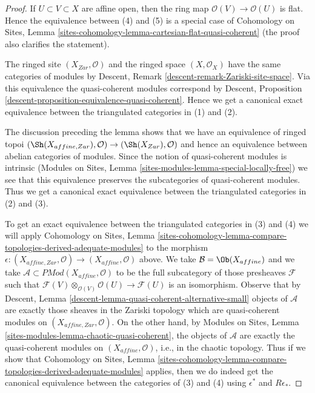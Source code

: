 \begin{proof}
If $U \subset V \subset X$ are affine open, then the ring map
$\mathcal{O}(V) \to \mathcal{O}(U)$ is flat. Hence
the equivalence between (4) and (5) is a special case of
Cohomology on Sites, Lemma
\ref{sites-cohomology-lemma-cartesian-flat-quasi-coherent}
(the proof also clarifies the statement).

\medskip\noindent
The ringed site $(X_{Zar}, \mathcal{O})$ and the ringed space
$(X, \mathcal{O}_X)$ have the same categories of modules by
Descent, Remark \ref{descent-remark-Zariski-site-space}.
Via this equivalence the quasi-coherent modules correspond by
Descent, Proposition \ref{descent-proposition-equivalence-quasi-coherent}.
Hence we get a canonical exact equivalence between the triangulated
categories in (1) and (2).

\medskip\noindent
The discussion preceding the lemma shows that we have an equivalence of
ringed topoi
$(\Sh(X_{affine, Zar}), \mathcal{O}) \to (\Sh(X_{Zar}), \mathcal{O})$
and hence an equivalence between abelian categories of modules.
Since the notion of quasi-coherent modules is intrinsic
(Modules on Sites, Lemma \ref{sites-modules-lemma-special-locally-free})
we see that this equivalence preserves the subcategories
of quasi-coherent modules. Thus we get a canonical exact equivalence
between the triangulated categories in (2) and (3).

\medskip\noindent
To get an exact equivalence between the triangulated categories
in (3) and (4) we will apply Cohomology on Sites, Lemma
\ref{sites-cohomology-lemma-compare-topologies-derived-adequate-modules}
to the morphism $\epsilon : (X_{affine, Zar}, \mathcal{O}) \to
(X_{affine}, \mathcal{O})$ above. We take
$\mathcal{B} = \Ob(X_{affine})$ and we take
$\mathcal{A} \subset \textit{PMod}(X_{affine}, \mathcal{O})$
to be the full subcategory of those presheaves $\mathcal{F}$
such that $\mathcal{F}(V) \otimes_{\mathcal{O}(V)} \mathcal{O}(U)
\to \mathcal{F}(U)$ is an isomorphism. Observe that by
Descent, Lemma \ref{descent-lemma-quasi-coherent-alternative-small}
objects of $\mathcal{A}$ are exactly those sheaves in the Zariski
topology which are quasi-coherent modules on $(X_{affine, Zar}, \mathcal{O})$.
On the other hand, by Modules on Sites, Lemma
\ref{sites-modules-lemma-chaotic-quasi-coherent},
the objects of $\mathcal{A}$ are exactly the quasi-coherent modules
on $(X_{affine}, \mathcal{O})$, i.e., in the chaotic topology.
Thus if we show that Cohomology on Sites, Lemma
\ref{sites-cohomology-lemma-compare-topologies-derived-adequate-modules}
applies, then we do indeed get the canonical equivalence between the
categories of (3) and (4) using $\epsilon^*$ and $R\epsilon_*$.


\end{proof}

